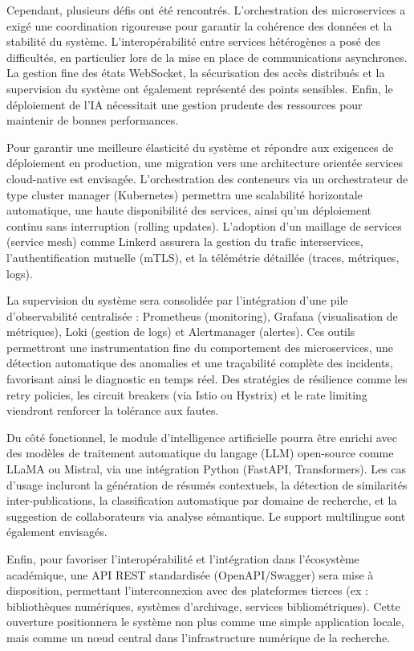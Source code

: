 \documentclass[12pt]{rapportPfe}
\begin{document}
Cependant, plusieurs défis ont été rencontrés. L’orchestration des microservices a exigé une coordination rigoureuse pour garantir la cohérence des données et la stabilité du système. L’interopérabilité entre services hétérogènes a posé des difficultés, en particulier lors de la mise en place de communications asynchrones. La gestion fine des états WebSocket, la sécurisation des accès distribués et la supervision du système ont également représenté des points sensibles. Enfin, le déploiement de l’IA nécessitait une gestion prudente des ressources pour maintenir de bonnes performances.

Pour garantir une meilleure élasticité du système et répondre aux exigences de déploiement en production, une migration vers une architecture orientée services cloud-native est envisagée. L’orchestration des conteneurs via un orchestrateur de type cluster manager (Kubernetes) permettra une scalabilité horizontale automatique, une haute disponibilité des services, ainsi qu’un déploiement continu sans interruption (rolling updates). L’adoption d’un maillage de services (service mesh) comme Linkerd assurera la gestion du trafic interservices, l’authentification mutuelle (mTLS), et la télémétrie détaillée (traces, métriques, logs).

La supervision du système sera consolidée par l’intégration d’une pile d’observabilité centralisée : Prometheus (monitoring), Grafana (visualisation de métriques), Loki (gestion de logs) et Alertmanager (alertes). Ces outils permettront une instrumentation fine du comportement des microservices, une détection automatique des anomalies et une traçabilité complète des incidents, favorisant ainsi le diagnostic en temps réel. Des stratégies de résilience comme les retry policies, les circuit breakers (via Istio ou Hystrix) et le rate limiting viendront renforcer la tolérance aux fautes.

Du côté fonctionnel, le module d’intelligence artificielle pourra être enrichi avec des modèles de traitement automatique du langage (LLM) open-source comme LLaMA ou Mistral, via une intégration Python (FastAPI, Transformers). Les cas d’usage incluront la génération de résumés contextuels, la détection de similarités inter-publications, la classification automatique par domaine de recherche, et la suggestion de collaborateurs via analyse sémantique. Le support multilingue sont également envisagés.

Enfin, pour favoriser l’interopérabilité et l’intégration dans l’écosystème académique, une API REST standardisée (OpenAPI/Swagger) sera mise à disposition, permettant l’interconnexion avec des plateformes tierces (ex : bibliothèques numériques, systèmes d’archivage, services bibliométriques). Cette ouverture positionnera le système non plus comme une simple application locale, mais comme un nœud central dans l’infrastructure numérique de la recherche.
\end{document}
